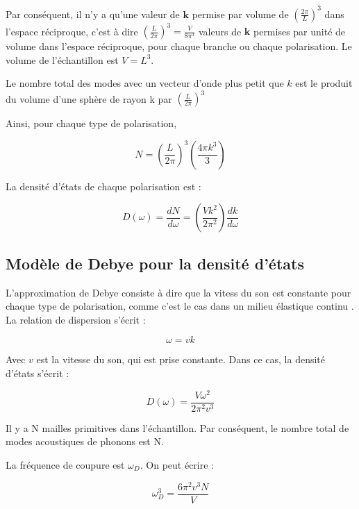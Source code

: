 Par conséquent, il n'y a qu'une valeur de $\mathbf{k}$ permise par volume de
$\left( \frac{2\pi}{L} \right)^3$ dans l'espace réciproque, c'est à dire
$\left( \frac{L}{2\pi} \right)^3 = \frac{V}{8\pi^3}$ valeurs de $\mathbf{k}$
permises par unité de volume dans l'espace réciproque, pour chaque branche ou
chaque polarisation. Le volume de l'échantillon est $V = L^3$.

Le nombre total des modes avec un vecteur d'onde plus petit que $k$ est le
produit du volume d'une sphère de rayon k par $\left( \frac{L}{2\pi} \right)^3$

Ainsi, pour chaque type de polarisation,

\begin{equation}
    N = \left( \frac{L}{2\pi} \right)^3 \left( \frac{4\pi k^3}{3} \right)
\end{equation}

La densité d'états de chaque polarisation est :

\begin{equation}
    D(\omega) = \frac{dN}{d\omega} = \left( \frac{Vk^2}{2\pi^2} \right) \frac{dk}{d\omega}
\end{equation}

\subsection{Modèle de Debye pour la densité d'états}

L'approximation de Debye consiste à dire que la vitess du son est constante pour
chaque type de polarisation, comme c'est le cas dans un milieu élastique continu
. La relation de dispersion s'écrit :

\begin{equation}
    \omega = v k
\end{equation}

Avec $v$ est la vitesse du son, qui est prise constante. Dans ce cas, la densité
d'états s'écrit :

\begin{equation}
    D(\omega) = \frac{V\omega^2}{2\pi^2v^3}
\end{equation}

Il y a N mailles primitives dans l'échantillon. Par conséquent, le nombre total 
de modes acoustiques de phonons est N.

La fréquence de coupure est $\omega_D$.
On peut écrire :

\begin{equation}
    \omega_D^3 = \frac{6\pi^2v^3 N}{V}
\end{equation}


